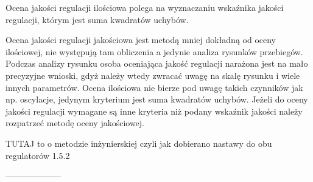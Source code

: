 Ocena jakości regulacji ilościowa polega na wyznaczaniu wskaźnika jakości regulacji, którym jest suma kwadratów uchybów. 

Ocena jakości regulacji jakościowa jest metodą mniej dokładną od oceny ilościowej, nie występują tam obliczenia a jedynie analiza rysunków przebiegów. Podczas analizy rysunku osoba oceniająca jakość regulacji narażona jest na mało precyzyjne wnioski, gdyż należy wtedy zwracać uwagę na skalę rysunku i wiele innych parametrów. Ocena ilościowa nie bierze pod uwagę takich czynników jak np. oscylacje, jedynym kryterium jest suma kwadratów uchybów. Jeżeli do oceny jakości regulacji wymagane są inne kryteria niż podany wskaźnik jakości należy rozpatrzeć metodę oceny jakościowej. 


TUTAJ to o metodzie inżynierskiej czyli jak dobierano nastawy do obu regulatorów 
1.5.2

--------------------